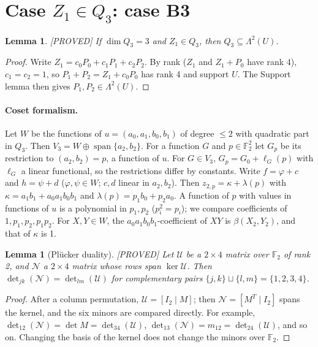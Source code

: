 \documentclass[11pt,a4paper]{article}
\theoremstyle{plain}
\newtheorem{lemma}[theorem]{Lemma}
\theoremstyle{definition}
\theoremstyle{remark}
\newcommand{\F}{\mathbb{F}_2}
\newcommand{\Span}{\operatorname{span}}
\newcommand{\Lam}{\Lambda^{2}}
\newcommand{\status}[1]{\hfill\textsf{[#1]}}
\begin{document}
\section{Case $Z_1\in Q_3$: case B3}

\begin{lemma}\label{lem:B3U}\status{PROVED}
If $\dim Q_3=3$ and $Z_1\in Q_3$, then $Q_3\subseteq\Lam(U)$.
\end{lemma}

\begin{proof}
Write $Z_1=c_0P_0+c_1P_1+c_2P_2$. By rank ($Z_1$ and $Z_1+P_0$ have rank 4), $c_1=c_2=1$, so $P_1+P_2=Z_1+c_0P_0$ has rank 4 and support $U$. The Support lemma then gives $P_1,P_2\in\Lam(U)$.
\end{proof}

\paragraph{Coset formalism.} Let $W$ be the functions of $u=(a_0,a_1,b_0,b_1)$ of degree $\le2$ with quadratic part in $Q_3$. Then $V_3=W\oplus\Span\{a_2,b_2\}$. For a function $G$ and $p\in\F^2$ let $G_p$ be its restriction to $(a_2,b_2)=p$, a function of $u$. For $G\in V_3$, $G_p=G_0+\ell_G(p)$ with $\ell_G$ a linear functional, so the restrictions differ by constants. Write $f=\varphi+c$ and $h=\psi+d$ ($\varphi,\psi\in W$; $c,d$ linear in $a_2,b_2$). Then $z_{2,p}=\kappa+\lambda(p)$ with $\kappa=a_1b_1+a_0a_1b_0b_1$ and $\lambda(p)=p_1b_0+p_2a_0$. A function of $p$ with values in functions of $u$ is a polynomial in $p_1,p_2$ ($p_i^2=p_i$); we compare coefficients of $1,p_1,p_2,p_1p_2$. For $X,Y\in W$, the $a_0a_1b_0b_1$-coefficient of $XY$ is $\beta(X_2,Y_2)$, and that of $\kappa$ is 1.

\begin{lemma}[Pl\"ucker duality]\label{lem:pl}\status{PROVED}
Let $\mathcal U$ be a $2\times4$ matrix over $\F$ of rank 2, and $\mathcal N$ a $2\times4$ matrix whose rows span $\ker\mathcal U$. Then $\det_{jk}(\mathcal N)=\det_{lm}(\mathcal U)$ for complementary pairs $\{j,k\}\sqcup\{l,m\}=\{1,2,3,4\}$.
\end{lemma}

\begin{proof}
After a column permutation, $\mathcal U=[I_2\mid M]$; then $\mathcal N=[M^{T}\mid I_2]$ spans the kernel, and the six minors are compared directly. For example, $\det_{12}(\mathcal N)=\det M=\det_{34}(\mathcal U)$, $\det_{13}(\mathcal N)=m_{12}=\det_{24}(\mathcal U)$, and so on. Changing the basis of the kernel does not change the minors over $\F$.
\end{proof}
\end{document}
